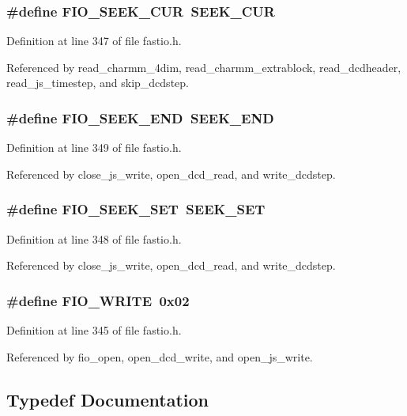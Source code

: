 \subsubsection{\setlength{\rightskip}{0pt plus 5cm}\#define FIO\_\-SEEK\_\-CUR\ SEEK\_\-CUR}\label{fastio_8h_a2}




Definition at line 347 of file fastio.h.

Referenced by read\_\-charmm\_\-4dim, read\_\-charmm\_\-extrablock, read\_\-dcdheader, read\_\-js\_\-timestep, and skip\_\-dcdstep.
\subsubsection{\setlength{\rightskip}{0pt plus 5cm}\#define FIO\_\-SEEK\_\-END\ SEEK\_\-END}\label{fastio_8h_a4}




Definition at line 349 of file fastio.h.

Referenced by close\_\-js\_\-write, open\_\-dcd\_\-read, and write\_\-dcdstep.
\subsubsection{\setlength{\rightskip}{0pt plus 5cm}\#define FIO\_\-SEEK\_\-SET\ SEEK\_\-SET}\label{fastio_8h_a3}




Definition at line 348 of file fastio.h.

Referenced by close\_\-js\_\-write, open\_\-dcd\_\-read, and write\_\-dcdstep.
\subsubsection{\setlength{\rightskip}{0pt plus 5cm}\#define FIO\_\-WRITE\ 0x02}\label{fastio_8h_a1}




Definition at line 345 of file fastio.h.

Referenced by fio\_\-open, open\_\-dcd\_\-write, and open\_\-js\_\-write.

\subsection{Typedef Documentation}
